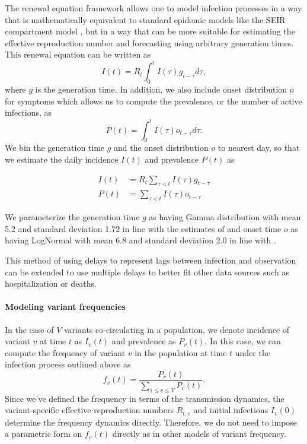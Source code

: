 \documentclass[11pt,oneside,letterpaper]{article}
\begin{document}
The renewal equation framework allows one to model infection processes in a way that is mathematically equivalent to standard epidemic models like the SEIR compartment model \cite{Champredon2018}, but in a way that can be more suitable for estimating the effective reproduction number and forecasting using arbitrary generation times. This renewal equation can be written as
\begin{equation}
  I(t) = R_{t} \int_{0}^{t} I(\tau)g_{t-\tau} d\tau,
\end{equation}
where $g$ is the generation time.
In addition, we also include onset distribution $o$ for symptoms which allows us to compute the prevalence, or the number of active infections, as
\begin{equation}
  P(t) = \int_{0}^{t} I(\tau) o_{t-\tau} d \tau.
\end{equation}
We bin the generation time $g$ and the onset distribution $o$ to nearest day, so that we estimate the daily incidence $I(t)$ and prevalence $P(t)$ as

\begin{align}
  I(t) &= R_{t} \sum_{\tau < t} I(\tau) g_{t-\tau}\\
  P(t) &= \sum_{\tau < t} I(\tau) o_{t-\tau}
\end{align}

We parameterize the generation time $g$ as having Gamma distribution with mean 5.2 and standard deviation 1.72 in line with the estimates of \cite{Ganyani2020} and onset time $o$ as having LogNormal with mean 6.8 and standard deviation 2.0 in line with \cite{Cheng2021}.

This method of using delays to represent lags between infection and observation can be extended to use multiple delays to better fit other data sources such as hospitalization or deaths.

\paragraph{Modeling variant frequencies}%

In the case of $V$ variants co-circulating in a population, we denote incidence of variant $v$ at time $t$ as $I_{v}(t)$ and prevalence as $P_{v}(t)$.
In this case, we can compute the frequency of variant $v$ in the population at time $t$ under the infection process outlined above as
\begin{equation}
  f_{v}(t) = \frac{P_{v}(t)}{ \sum_{1\leq v \leq V} P_{v}(t)}.
\end{equation}
Since we've defined the frequency in terms of the transmission dynamics, the variant-specific effective reproduction numbers $R_{t,v}$ and initial infections $I_{v}(0)$ determine the frequency dynamics directly.
Therefore, we do not need to impose a parametric form on $f_{v}(t)$ directly as in other models of variant frequency.
\end{document}
